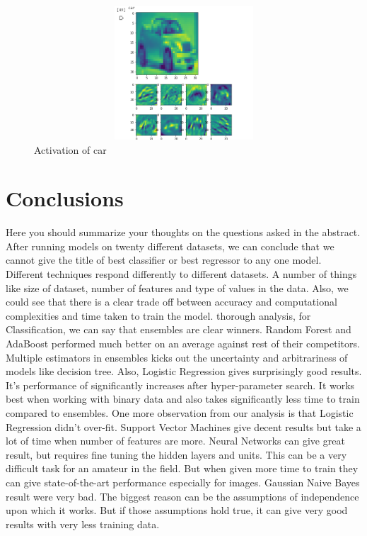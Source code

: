 \documentclass[10pt,twocolumn,letterpaper]{article}
\begin{document}
\begin{figure}
   \begin{center}
   \includegraphics[width=15cm,height=5cm,keepaspectratio]{activation.png}
   \end{center}
      \caption{Activation of car\label{activation}}
\end{figure}






\section{Conclusions}

Here you should summarize your thoughts on the questions asked in the abstract.
\newline After running models on twenty different datasets, we can conclude that we cannot give the title of best classifier or best regressor to any one model. Different techniques respond differently to different datasets. A number of things like size of dataset, number of features and type of values in the data. Also, we could see that there is a clear trade off between accuracy and computational complexities and time taken to train the model.
\newlineAfter thorough analysis, for Classification, we can say that ensembles are clear winners. Random Forest and AdaBoost performed much better on an average against rest of their competitors. Multiple estimators in ensembles kicks out the uncertainty and arbitrariness of models like decision tree. Also, Logistic Regression gives surprisingly good results. It's performance of significantly increases after hyper-parameter search. It works best when working with binary data and also takes significantly less time to train compared to ensembles. One more observation from our analysis is that Logistic Regression didn't over-fit. Support Vector Machines give decent results but take a lot of time when number of features are more. Neural Networks can give great result, but requires fine tuning the hidden layers and units. This can be a very difficult task for an amateur in the field. But when given more time to train they can give state-of-the-art performance especially for images. Gaussian Naive Bayes result were very bad. The biggest reason can be the  assumptions of independence upon which it works. But if those assumptions hold true, it can give very good results with very less training data.
\end{document}
